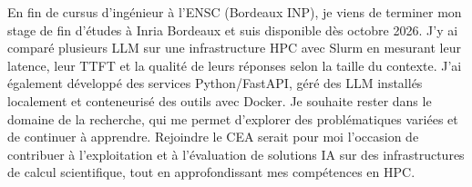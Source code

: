 
\begin{cvparagraph}
En fin de cursus d’ingénieur à l’ENSC (Bordeaux INP), je viens de terminer mon stage de fin d’études à Inria Bordeaux et suis disponible dès octobre 2026. J’y ai comparé plusieurs LLM sur une infrastructure HPC avec Slurm en mesurant leur latence, leur TTFT et la qualité de leurs réponses selon la taille du contexte. J’ai également développé des services Python/FastAPI, géré des LLM installés localement et conteneurisé des outils avec Docker. Je souhaite rester dans le domaine de la recherche, qui me permet d’explorer des problématiques variées et de continuer à apprendre. Rejoindre le CEA serait pour moi l’occasion de contribuer à l’exploitation et à l’évaluation de solutions IA sur des infrastructures de calcul scientifique, tout en approfondissant mes compétences en HPC.
\end{cvparagraph}
